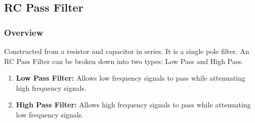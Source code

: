 \subsection{RC Pass Filter}

\subsubsection{Overview}
Constructed from a resistor and capacitor in series. It
is a single pole filter. An RC Pass Filter can be broken
down into two types: Low Pass and High Pass.
\begin{enumerate}
  \item \textbf{Low Pass Filter:} Allows low frequency
    signals to pass while attenuating high frequency
    signals.
  \item \textbf{High Pass Filter:} Allows high frequency
    signals to pass while attenuating low frequency
    signals.
\end{enumerate}

